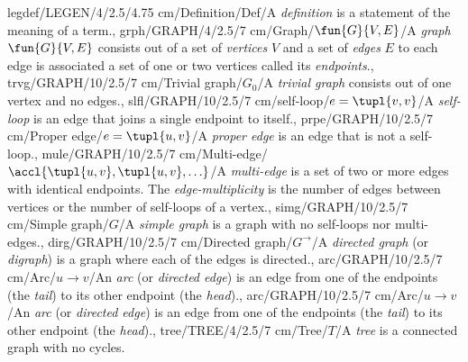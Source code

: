 legdef/LEGEN/4/2.5/4.75 cm/Definition/Def/{A \emph{definition} is a statement of the meaning of a term.},
grph/GRAPH/4/2.5/7 cm/Graph/{$\fun{G}{V,E}$}/{A \emph{graph} $\fun{G}{V,E}$ consists out of a set of \emph{vertices} $V$ and a set of \emph{edges} $E$ to each edge is associated a set of one or two vertices called its \emph{endpoints}.},
trvg/GRAPH/10/2.5/7 cm/{Trivial graph}/$G_0$/{A \emph{trivial graph} consists out of one vertex and no edges.},
slfl/GRAPH/10/2.5/7 cm/{self-loop}/$e=\tupl{v,v}$/{A \emph{self-loop} is an edge that joins a single endpoint to itself.},
prpe/GRAPH/10/2.5/7 cm/{Proper edge}/$e=\tupl{u,v}$/{A \emph{proper edge} is an edge that is not a self-loop.},
mule/GRAPH/10/2.5/7 cm/{Multi-edge}/$\accl{\tupl{u,v},\tupl{u,v},\ldots}$/{A \emph{multi-edge} is a set of two or more edges with identical endpoints. The \emph{edge-multiplicity} is the number of edges between vertices or the number of self-loops of a vertex.},
simg/GRAPH/10/2.5/7 cm/{Simple graph}/$G$/{A \emph{simple graph} is a graph with no self-loops nor multi-edges.},
dirg/GRAPH/10/2.5/7 cm/{Directed graph}/$G^{\rightarrow}$/{A \emph{directed graph} (or \emph{digraph}) is a graph where each of the edges is directed.},
arc/GRAPH/10/2.5/7 cm/{Arc}/$u\rightarrow v$/{An \emph{arc} (or \emph{directed edge}) is an edge from one of the endpoints (the \emph{tail}) to its other endpoint (the \emph{head}).},
arc/GRAPH/10/2.5/7 cm/{Arc}/$u\rightarrow v$/{An \emph{arc} (or \emph{directed edge}) is an edge from one of the endpoints (the \emph{tail}) to its other endpoint (the \emph{head}).},
tree/TREE/4/2.5/7 cm/Tree/$T$/{A \emph{tree} is a connected graph with no cycles.}